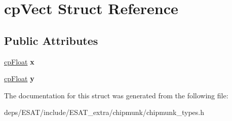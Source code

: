 \hypertarget{structcp_vect}{}\section{cp\+Vect Struct Reference}
\label{structcp_vect}
\subsection*{Public Attributes}
\begin{DoxyCompactItemize}
\item 
\mbox{\label{structcp_vect_a16371845f9474f321d137615edfc16ad}} 
\mbox{\hyperlink{group__basic_types_gac1ed65573e035bf892505768c852d8d3}{cp\+Float}} {\bfseries x}
\item 
\mbox{\label{structcp_vect_afe915cf8f8e2694cdad97f0ce33bd4fd}} 
\mbox{\hyperlink{group__basic_types_gac1ed65573e035bf892505768c852d8d3}{cp\+Float}} {\bfseries y}
\end{DoxyCompactItemize}


The documentation for this struct was generated from the following file\+:\begin{DoxyCompactItemize}
\item 
deps/\+E\+S\+A\+T/include/\+E\+S\+A\+T\+\_\+extra/chipmunk/chipmunk\+\_\+types.\+h\end{DoxyCompactItemize}
